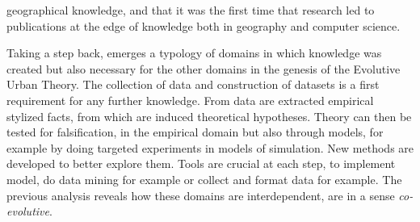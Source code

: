 \documentclass[runningheads,a4paper]{llncs2e/llncs}
\begin{document}
geographical knowledge, and that it was the first time that research led to publications at the edge of knowledge both in geography and computer science.

Taking a step back, emerges a typology of domains in which knowledge was created but also necessary for the other domains in the genesis of the Evolutive Urban Theory. The collection of data and construction of datasets is a first requirement for any further knowledge. From data are extracted empirical stylized facts, from which are induced theoretical hypotheses. Theory can then be tested for falsification, in the empirical domain but also through models, for example by doing targeted experiments in models of simulation. New methods are developed to better explore them. Tools are crucial at each step, to implement model, do data mining for example or collect and format data for example. The previous analysis reveals how these domains are interdependent, are in a sense \emph{co-evolutive}.
\end{document}

